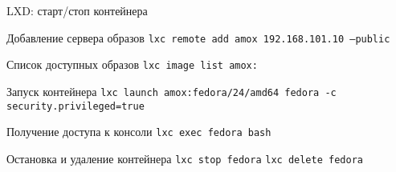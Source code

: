 \begin{frame}{LXD: старт/стоп контейнера}
	\begin{block}{Добавление сервера образов}
		{\tt lxc remote add amox 192.168.101.10 --public}
	\end{block}
	\begin{block}{Список доступных образов}
		{\tt lxc image list amox: }
	\end{block}
	\begin{block}{Запуск контейнера}
		{\tt lxc launch amox:fedora/24/amd64 fedora -c security.privileged=true }
	\end{block}
	\begin{block}{Получение доступа к консоли}
		{\tt lxc exec fedora bash }
	\end{block}

	\begin{block}{Остановка и удаление контейнера}
		{\tt lxc stop fedora}
		{\tt lxc delete fedora}
	\end{block}
\end{frame}
